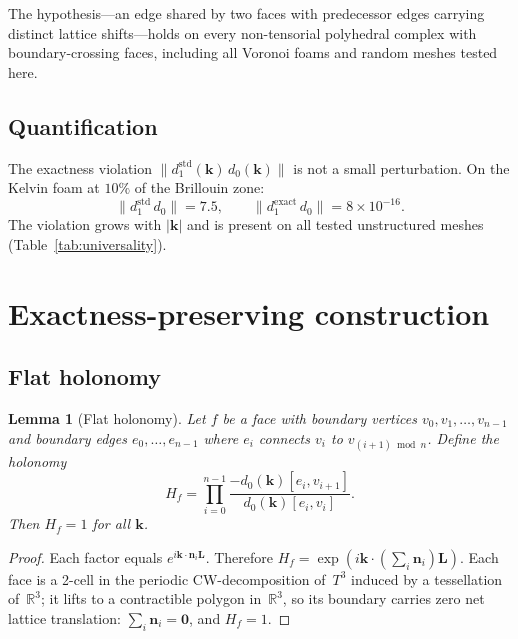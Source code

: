\documentclass[preprint,12pt]{elsarticle}
\newtheorem{lemma}{Lemma}
\begin{document}
The hypothesis---an edge shared by two faces with predecessor edges carrying distinct lattice shifts---holds on every non-tensorial polyhedral complex with boundary-crossing faces, including all Voronoi foams and random meshes tested here.

\subsection{Quantification}

The exactness violation $\|d_1^{\mathrm{std}}(\mathbf{k})\,d_0(\mathbf{k})\|$ is not a small perturbation. On the Kelvin foam at $10\%$ of the Brillouin zone:
\begin{equation}
  \|d_1^{\mathrm{std}}\,d_0\| = 7.5, \qquad
  \|d_1^{\mathrm{exact}}\,d_0\| = 8 \times 10^{-16}.
\end{equation}
The violation grows with $|\mathbf{k}|$ and is present on all tested unstructured meshes (Table~\ref{tab:universality}).

\section{Exactness-preserving construction}
\label{sec:construction}

\subsection{Flat holonomy}

\begin{lemma}[Flat holonomy]\label{lem:holonomy}
Let $f$ be a face with boundary vertices $v_0, v_1, \ldots, v_{n-1}$ and boundary edges $e_0, \ldots, e_{n-1}$ where $e_i$ connects $v_i$ to $v_{(i+1)\bmod n}$. Define the holonomy
\begin{equation}\label{eq:holonomy}
  H_f = \prod_{i=0}^{n-1} \frac{-d_0(\mathbf{k})[e_i, v_{i+1}]}{d_0(\mathbf{k})[e_i, v_i]}.
\end{equation}
Then $H_f = 1$ for all $\mathbf{k}$.
\end{lemma}

\begin{proof}
Each factor equals $e^{i\mathbf{k}\cdot\mathbf{n}_i\mathbf{L}}$. Therefore $H_f = \exp(i\mathbf{k}\cdot(\sum_i \mathbf{n}_i)\mathbf{L})$. Each face is a 2-cell in the periodic CW-decomposition of~$T^3$ induced by a tessellation of~$\mathbb{R}^3$; it lifts to a contractible polygon in~$\mathbb{R}^3$, so its boundary carries zero net lattice translation: $\sum_i \mathbf{n}_i = \mathbf{0}$, and $H_f = 1$.
\end{proof}
\end{document}

